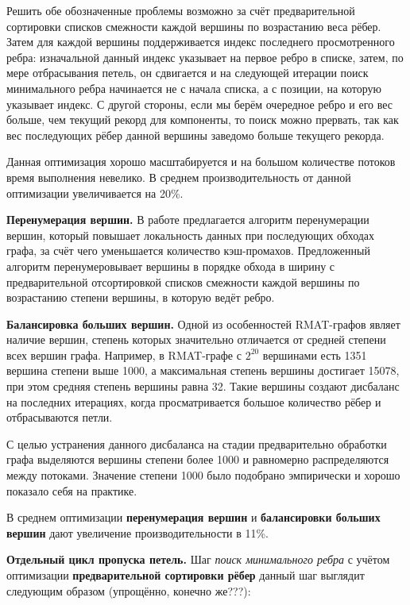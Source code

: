 \documentclass[a4paper,10pt]{extarticle}
\begin{document}
Решить обе обозначенные проблемы возможно за счёт предварительной сортировки списков смежности каждой вершины по возрастанию веса рёбер. Затем для каждой вершины поддерживается индекс последнего просмотренного ребра: изначальной данный индекс указывает на первое ребро в списке, затем, по мере отбрасывания петель, он сдвигается и на следующей итерации поиск минимального ребра начинается не с начала списка, а с позиции, на которую указывает индекс. С другой стороны, если мы берём очередное ребро и его вес больше, чем текущий рекорд для компоненты, то поиск можно прервать, так как вес последующих рёбер данной вершины заведомо больше текущего рекорда.

Данная оптимизация хорошо масштабируется и на большом количестве потоков время выполнения невелико. В среднем производительность от данной оптимизации увеличивается на 20\%.



\textbf{Перенумерация вершин.}
В работе \cite{sparse-matrix-renum} предлагается алгоритм перенумерации вершин, который повышает локальность данных при последующих обходах графа, за счёт чего уменьшается количество кэш-промахов. %
Предложенный алгоритм перенумеровывает вершины в порядке обхода в ширину с предварительной отсортировкой списков смежности каждой вершины по возрастанию степени вершины, в которую ведёт ребро.


\textbf{Балансировка больших вершин.}
Одной из особенностей RMAT-графов являет наличие вершин, степень которых значительно отличается от средней степени всех вершин графа. Например, в RMAT-графе с $2^{20}$ вершинами есть 1351 вершина степени выше 1000, а максимальная степень вершины достигает 15078, при этом средняя степень вершины равна 32. Такие вершины создают дисбаланс на последних итерациях, когда просматривается большое количество рёбер и отбрасываются петли.

С целью устранения данного дисбаланса на стадии предварительно обработки графа выделяются вершины степени более 1000 и равномерно распределяются между потоками. Значение степени 1000 было подобрано эмпирически и хорошо показало себя на практике.

В среднем оптимизации \textbf{перенумерация вершин} и \textbf{балансировки больших вершин} дают увеличение производительности в 11\%.



\textbf{Отдельный цикл пропуска петель.}
Шаг \textit{поиск минимального ребра} с учётом оптимизации \textbf{предварительной сортировки рёбер} данный шаг выглядит следующим образом (упрощённо, конечно же???):
\end{document}
